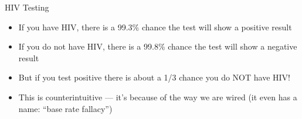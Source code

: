 \documentclass{beamer}\usepackage[]{graphicx}\usepackage[]{color}
\begin{document}
\begin{darkframes}
    \begin{frame}{HIV Testing}
      \begin{itemize}[<+->]
        \item If you have HIV, there is a 99.3\% chance the test will show a positive result
        \item If you do not have HIV, there is a 99.8\% chance the test will show a negative result
        \item But if you test positive there is about a 1/3 chance you do NOT have HIV!
        \item This is counterintuitive --- it's because of the way we are wired (it even has a name: ``base rate fallacy'')
      \end{itemize}
    \end{frame}
  \end{darkframes}
\end{document}
